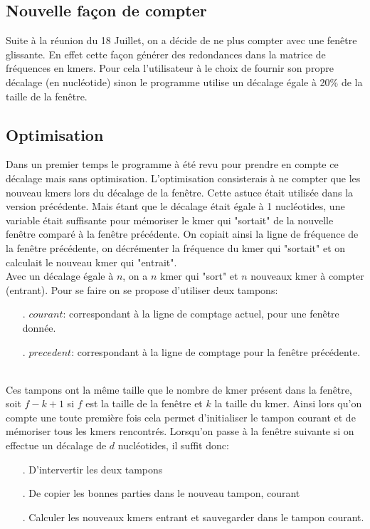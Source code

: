 \subsection{Nouvelle façon de compter}
Suite à la réunion du 18 Juillet, on a décide de ne plus compter avec une fenêtre glissante. En effet cette façon générer des redondances dans la matrice de fréquences en kmers. Pour 
cela l'utilisateur à le choix de fournir son propre décalage (en nucléotide) sinon le programme utilise un décalage égale à 20\% de la taille de la fenêtre.

\subsection{Optimisation}
Dans un premier temps le programme à été revu pour prendre en compte ce décalage mais sans optimisation. L'optimisation consisterais à ne compter que les nouveau kmers lors du décalage de la fenêtre. Cette astuce était utilisée dans la version précédente. Mais étant que le décalage était égale à 1 nucléotides, une variable était suffisante pour mémoriser le kmer qui "sortait" de la nouvelle fenêtre comparé à la fenêtre précédente. On copiait ainsi la ligne de fréquence de la fenêtre précédente, on décrémenter la fréquence du kmer qui "sortait" et on calculait le nouveau kmer qui "entrait".
\\

Avec un décalage égale à $n$, on a $n$ kmer qui "sort" et $n$ nouveaux kmer à compter (entrant). Pour se faire on se propose d'utiliser deux tampons: 
\\
\begin{itemize}
 \item[.] $courant$: correspondant à la ligne de comptage actuel, pour une fenêtre donnée.
 \item[.] $precedent$: correspondant à la ligne de comptage pour la fenêtre précédente.
\end{itemize}
~\\

Ces tampons ont la même taille que le nombre de kmer présent dans la fenêtre, soit $f-k+1$ si $f$ est la taille de la fenêtre et $k$ la taille du kmer. Ainsi lors qu'on compte une toute première fois cela permet d'initialiser le tampon courant et de mémoriser tous les kmers rencontrés. Lorsqu'on passe à la fenêtre suivante si on effectue un décalage de $d$ nucléotides, il suffit donc:
\\
\begin{itemize}
 \item[.] D'intervertir les deux tampons
 \item[.] De copier les bonnes parties dans le nouveau tampon, courant
 \item[.] Calculer les nouveaux kmers entrant et sauvegarder dans le tampon courant.
\end{itemize}
~\\

